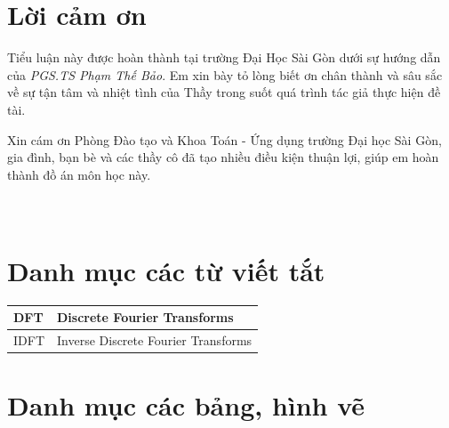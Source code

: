 \documentclass[12pt,a4paper]{report}
\numberwithin{equation}{section}
\theoremstyle{definition} %
\begin{document}
	\chapter*{Lời cảm ơn}
	\thispagestyle{fancy}
	\vspace{1cm}
	\indent
	
Tiểu luận này được hoàn thành tại trường Đại Học Sài Gòn dưới sự hướng dẫn của \textit{PGS.TS Phạm Thế Bảo}. Em xin bày tỏ lòng biết ơn chân thành và sâu sắc về sự tận tâm và nhiệt tình của Thầy trong suốt quá trình tác giả thực hiện đề tài.
	
	
	\bigskip
	Xin cám ơn Phòng Đào tạo  và Khoa Toán - Ứng dụng trường Đại học Sài Gòn, gia đình, bạn bè  và các thầy cô đã tạo nhiều điều kiện thuận lợi, giúp em hoàn thành đồ án môn học này.
	\\
	\\
	\\

	
	\newpage
	
	\tableofcontents

	\chapter*{Danh mục các từ viết tắt  }
\thispagestyle{fancy}
\vspace{1cm}
\indent

\begin{center}
	\begin{tabular}{ |p{3cm}|p{5cm}|  }
		\hline
		DFT & Discrete Fourier Transforms  \\ \hline
		IDFT & Inverse Discrete Fourier Transforms  \\ \hline
	\end{tabular}
\end{center}

	\chapter*{Danh mục các bảng, hình vẽ  }
\thispagestyle{fancy}
\vspace{1cm}
\indent
\end{document}
